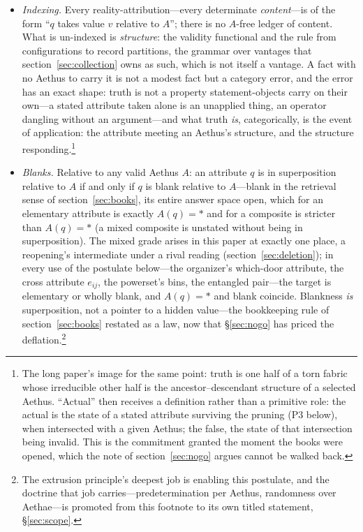 \documentclass[11pt]{article}
\theoremstyle{definition}
\newcommand{\Aethus}{Aethus}
\begin{document}
\begin{itemize}
\item[\textbf{P1.}] \emph{Indexing.} Every reality-attribution---every determinate \emph{content}---is of the form ``$q$ takes value $v$ relative to $A$''; there is no $A$-free ledger of content. What is un-indexed is \emph{structure}: the validity functional and the rule from configurations to record partitions, the grammar over vantages that section~\ref{sec:collection} owns as such, which is not itself a vantage. A fact with no \Aethus{} to carry it is not a modest fact but a category error, and the error has an exact shape: truth is not a property statement-objects carry on their own---a stated attribute taken alone is an unapplied thing, an operator dangling without an argument---and what truth \emph{is}, categorically, is the event of application: the attribute meeting an \Aethus's structure, and the structure responding.\footnote{The long paper's image for the same point: truth is one half of a torn fabric whose irreducible other half is the ancestor--descendant structure of a selected \Aethus. ``Actual'' then receives a definition rather than a primitive role: the actual is the state of a stated attribute surviving the pruning (P3 below), when intersected with a given \Aethus; the false, the state of that intersection being invalid. This is the commitment granted the moment the books were opened, which the note of section~\ref{sec:nogo} argues cannot be walked back.}
\item[\textbf{P2.}] \emph{Blanks.} Relative to any valid \Aethus{} $A$: an attribute $q$ is in superposition relative to $A$ if and only if $q$ is blank relative to $A$---blank in the retrieval sense of section~\ref{sec:books}, its entire answer space open, which for an elementary attribute is exactly $A(q)=\ast$ and for a composite is stricter than $A(q)=\ast$ (a mixed composite is unstated without being in superposition). The mixed grade arises in this paper at exactly one place, a reopening's intermediate under a rival reading (section~\ref{sec:deletion}); in every use of the postulate below---the organizer's which-door attribute, the cross attribute $e_{ij}$, the powerset's bins, the entangled pair---the target is elementary or wholly blank, and $A(q)=\ast$ and blank coincide. Blankness \emph{is} superposition, not a pointer to a hidden value---the bookkeeping rule of section~\ref{sec:books} restated as a law, now that \S\ref{sec:nogo} has priced the deflation.\footnote{The extrusion principle's deepest job is enabling this postulate, and the doctrine that job carries---predetermination per \Aethus{}, randomness over Aethae---is promoted from this footnote to its own titled statement, \S\ref{sec:scope}.}

\end{itemize}
\end{document}

